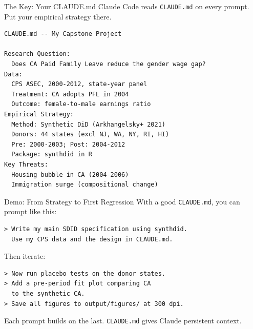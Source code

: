 \begin{frame}[fragile]{The Key: Your CLAUDE.md}
  \small
  Claude Code reads \texttt{CLAUDE.md} on every prompt. Put your empirical strategy there.

  \vspace{4pt}

\begin{lstlisting}[style=terminal, basicstyle=\ttfamily\scriptsize\color{darkgray}]
CLAUDE.md -- My Capstone Project

Research Question:
  Does CA Paid Family Leave reduce the gender wage gap?
Data:
  CPS ASEC, 2000-2012, state-year panel
  Treatment: CA adopts PFL in 2004
  Outcome: female-to-male earnings ratio
Empirical Strategy:
  Method: Synthetic DiD (Arkhangelsky+ 2021)
  Donors: 44 states (excl NJ, WA, NY, RI, HI)
  Pre: 2000-2003; Post: 2004-2012
  Package: synthdid in R
Key Threats:
  Housing bubble in CA (2004-2006)
  Immigration surge (compositional change)
\end{lstlisting}
\end{frame}

\begin{frame}[fragile]{Demo: From Strategy to First Regression}
  \small
  With a good \texttt{CLAUDE.md}, you can prompt like this:

  \vspace{4pt}

\begin{lstlisting}[style=terminal, basicstyle=\ttfamily\footnotesize\color{darkgray}]
> Write my main SDID specification using synthdid.
  Use my CPS data and the design in CLAUDE.md.
\end{lstlisting}

  \vspace{2pt}

  Then iterate:

  \vspace{2pt}

\begin{lstlisting}[style=terminal, basicstyle=\ttfamily\footnotesize\color{darkgray}]
> Now run placebo tests on the donor states.
> Add a pre-period fit plot comparing CA
  to the synthetic CA.
> Save all figures to output/figures/ at 300 dpi.
\end{lstlisting}

  \vspace{4pt}

  Each prompt builds on the last. \texttt{CLAUDE.md} gives Claude persistent context.
\end{frame}

